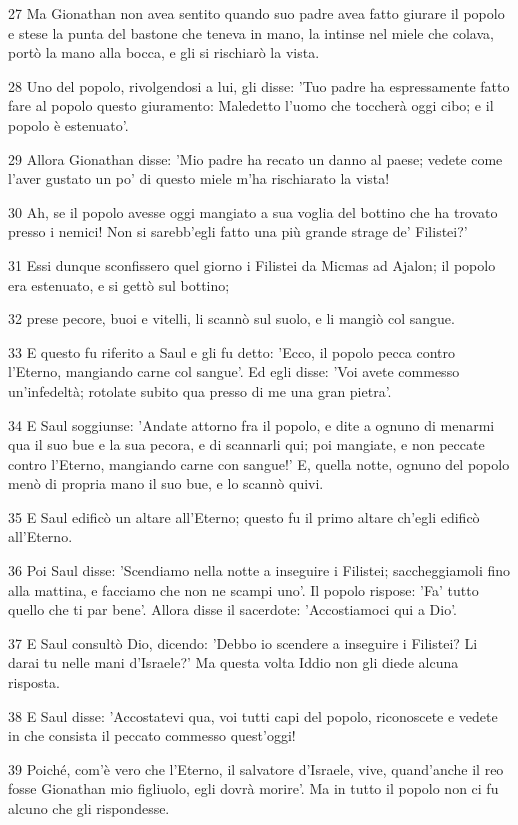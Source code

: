 \par 27 Ma Gionathan non avea sentito quando suo padre avea fatto giurare il popolo e stese la punta del bastone che teneva in mano, la intinse nel miele che colava, portò la mano alla bocca, e gli si rischiarò la vista.
\par 28 Uno del popolo, rivolgendosi a lui, gli disse: 'Tuo padre ha espressamente fatto fare al popolo questo giuramento: Maledetto l'uomo che toccherà oggi cibo; e il popolo è estenuato'.
\par 29 Allora Gionathan disse: 'Mio padre ha recato un danno al paese; vedete come l'aver gustato un po' di questo miele m'ha rischiarato la vista!
\par 30 Ah, se il popolo avesse oggi mangiato a sua voglia del bottino che ha trovato presso i nemici! Non si sarebb'egli fatto una più grande strage de' Filistei?'
\par 31 Essi dunque sconfissero quel giorno i Filistei da Micmas ad Ajalon; il popolo era estenuato, e si gettò sul bottino;
\par 32 prese pecore, buoi e vitelli, li scannò sul suolo, e li mangiò col sangue.
\par 33 E questo fu riferito a Saul e gli fu detto: 'Ecco, il popolo pecca contro l'Eterno, mangiando carne col sangue'. Ed egli disse: 'Voi avete commesso un'infedeltà; rotolate subito qua presso di me una gran pietra'.
\par 34 E Saul soggiunse: 'Andate attorno fra il popolo, e dite a ognuno di menarmi qua il suo bue e la sua pecora, e di scannarli qui; poi mangiate, e non peccate contro l'Eterno, mangiando carne con sangue!' E, quella notte, ognuno del popolo menò di propria mano il suo bue, e lo scannò quivi.
\par 35 E Saul edificò un altare all'Eterno; questo fu il primo altare ch'egli edificò all'Eterno.
\par 36 Poi Saul disse: 'Scendiamo nella notte a inseguire i Filistei; saccheggiamoli fino alla mattina, e facciamo che non ne scampi uno'. Il popolo rispose: 'Fa' tutto quello che ti par bene'. Allora disse il sacerdote: 'Accostiamoci qui a Dio'.
\par 37 E Saul consultò Dio, dicendo: 'Debbo io scendere a inseguire i Filistei? Li darai tu nelle mani d'Israele?' Ma questa volta Iddio non gli diede alcuna risposta.
\par 38 E Saul disse: 'Accostatevi qua, voi tutti capi del popolo, riconoscete e vedete in che consista il peccato commesso quest'oggi!
\par 39 Poiché, com'è vero che l'Eterno, il salvatore d'Israele, vive, quand'anche il reo fosse Gionathan mio figliuolo, egli dovrà morire'. Ma in tutto il popolo non ci fu alcuno che gli rispondesse.
